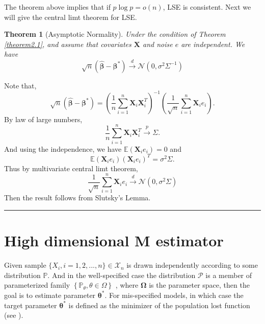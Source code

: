 \documentclass[12pt]{article}
\numberwithin{equation}{section}
\newtheorem{theorem}{Theorem}[section]
\newenvironment{proof}{{\bf Proof:}}{\hfill\rule{2mm}{2mm}}
\begin{document}
The theorem above implies that if $p\log p=o(n)$, LSE is consistent. Next we will give the central limt theorem for LSE.
\begin{theorem}[Asymptotic Normality]
	Under the condition of Theorem \ref{theorem2.1}, and assume that covariates $\boldsymbol{X}$ and noise $e$ are independent. We have
	\begin{equation}
	\sqrt{n}\left(\boldsymbol{\widehat{\beta}}-\boldsymbol{\beta}^{*}\right) \stackrel{d}{\longrightarrow} \mathcal{N}\left(0, \sigma^2\Sigma^{-1}\right)
	\end{equation}
\end{theorem}
\begin{proof}
	Note that,
	\begin{equation}
	\sqrt{n}\left(\boldsymbol{\widehat{\beta}}-\boldsymbol{\beta}^{*}\right)=\left(\frac{1}{n}\sum_{i=1}^{n}\boldsymbol{X}_i\boldsymbol{X}_i^T\right)^{-1}\left(\frac{1}{\sqrt{n}}\sum_{i=1}^n\boldsymbol{X}_ie_i\right).
	\end{equation}
	By law of large numbers,
	$$
	\frac{1}{n}\sum_{i=1}^{n}\boldsymbol{X}_i\boldsymbol{X}_i^T\stackrel{p}{\longrightarrow}\Sigma.
	$$
	And using the independence, we have $\mathbb{E}\left(\boldsymbol{X}_ie_i\right)=0$ and
	$$
	\mathbb{E}\left(\boldsymbol{X}_ie_i\right)\left(\boldsymbol{X}_ie_i\right)^T=\sigma^2\Sigma.
	$$
	Thus by multivariate central limt theorem,
	$$
	\frac{1}{\sqrt{n}}\sum_{i=1}^n\boldsymbol{X}_ie_i\stackrel{d}{\longrightarrow}\mathcal{N}\left(0,\sigma^2\Sigma\right)
	$$
	Then the result follows from Slutsky's Lemma.
\end{proof}

\section{High dimensional M estimator}
Given sample $\{X_i,i=1,2,...,n\}\in \mathcal{X}_n$ is drawn independently according to
some distribution $\mathbb{P}$. And in the well-specified case the distribution
$\mathcal{P}$ is a member of parameterized family $\left\{\mathbb{P}_{\theta}, \theta \in \Omega\right\}$ , where $\boldsymbol{\Omega}$ is the parameter space, then the goal is to estimate parameter $\boldsymbol{\theta}^{*}$. For mis-specified models, in which case the target parameter $\boldsymbol{\theta}^{*}$ is defined as the minimizer of the population lost function (see \citet{wainwright2019high}). 
\end{document}
